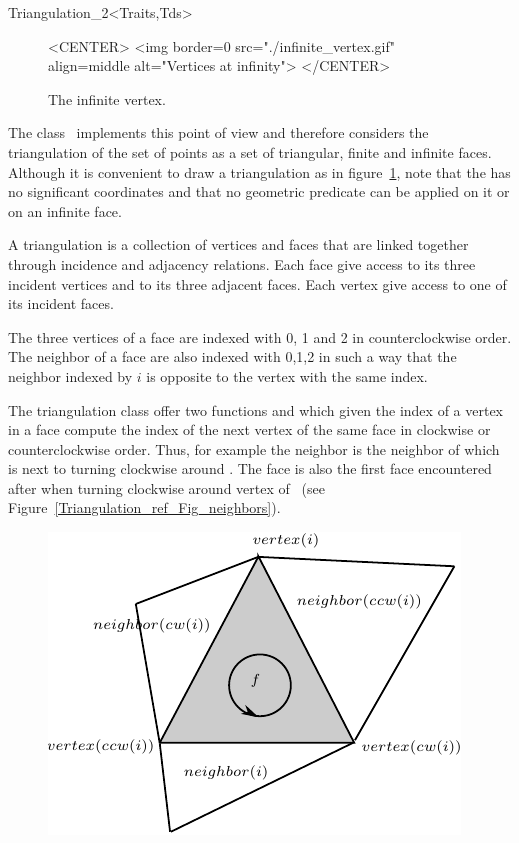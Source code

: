 \begin{ccRefClass}{Triangulation_2<Traits,Tds>}
\begin{figure}[h]
\begin{ccHtmlOnly}
<CENTER>
<img border=0 src="./infinite_vertex.gif" align=middle alt="Vertices at
infinity">
</CENTER>
\end{ccHtmlOnly}

\caption{The infinite vertex.
\label{Triangulation_ref_Fig_infinite_vertex}}
\end{figure}

The class \ccRefName\
implements this point of view
and therefore considers  the triangulation of the set of points 
as a set of  triangular,  finite and
infinite faces. 
Although it is convenient to draw a triangulation as in
figure~\ref{Triangulation_ref_Fig_infinite_vertex}, note that
the  has no significant
coordinates and that no geometric predicate can be applied on it
or on an infinite face.

A triangulation is a collection of vertices and faces that
are linked together through incidence and adjacency relations.
Each face give access to its three incident vertices and to
its 
three adjacent faces. Each vertex give access to one of its  incident
faces. 

The three vertices of a face are indexed with 0, 1 and 2
in counterclockwise order. The neighbor of a face are also 
indexed with 0,1,2 in such a way that the neighbor indexed by $i$
is opposite to the vertex with the same index.

The triangulation class
offer  two functions  and 
which given the index of a vertex in a face
compute the index of the next vertex  of the same face
in clockwise
or counterclockwise order.
 Thus, for example the neighbor 
 is
 the
neighbor of   which is next to  turning clockwise
around . The face \ccc{neighbor(cw(i))}
is also the first face encountered after  when
turning clockwise around vertex 
of~\ccc{f} (see Figure~\ref{Triangulation_ref_Fig_neighbors}).



 \begin{figure}
\begin{ccTexOnly}
    \begin{center}
     \includegraphics{Triangulation_2/neighbors}
    \end{center}
\end{ccTexOnly} 


\end{figure}
\end{ccRefClass}
